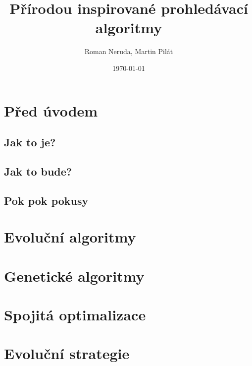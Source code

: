 \documentclass[a4paper,nofonts,nohyper,justified,colorinlistoftodos,hidelinks]{tufte-book}
\title{Přírodou inspirované prohledávací algoritmy}
\author{Roman Neruda, Martin Pilát}
\date{\today}
\begin{document}
\maketitle

\mainmatter

\chapter{Před úvodem}
\section{Jak to je?}

\section{Jak to bude?}
\section{Pok pok pokusy}


\chapter{Evoluční algoritmy}


\chapter{Genetické algoritmy}


\chapter{Spojitá optimalizace}


\chapter{Evoluční strategie}


\backmatter

\setcounter{tocdepth}{2}
\tableofcontents
\listoffigures
\listoftables
\listofalgorithms 
\printindex
\listoftodos

\nocite{*}


\end{document}
